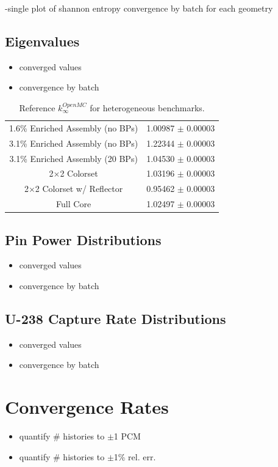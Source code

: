 -single plot of shannon entropy convergence by batch for each geometry

\subsection{Eigenvalues}

\begin{itemize}[noitemsep]
  \item converged values
  \item convergence by batch
\end{itemize}

\begin{table}[h!]
  \centering
  \caption[Reference $k^{OpenMC}_{\infty}$ for heterogeneous benchmarks]{Reference $k^{OpenMC}_{\infty}$ for heterogeneous benchmarks.}
  \small
  \label{table:chap7-ref-eigenvalues}
  \vspace{6pt}
  \begin{tabular}{c c}
  \toprule
  1.6\% Enriched Assembly (no BPs) & 1.00987 $\pm$ 0.00003 \\
  3.1\% Enriched Assembly (no BPs) & 1.22344 $\pm$ 0.00003 \\
  3.1\% Enriched Assembly (20 BPs) & 1.04530 $\pm$ 0.00003 \\
  2$\times$2 Colorset & 1.03196 $\pm$ 0.00003 \\
  2$\times$2 Colorset w/ Reflector & 0.95462 $\pm$ 0.00003 \\
  Full Core & 1.02497 $\pm$ 0.00003 \\
  \bottomrule
\end{tabular}
\end{table}

\subsection{Pin Power Distributions}

\begin{itemize}[noitemsep]
  \item converged values
  \item convergence by batch
\end{itemize}

\subsection{U-238 Capture Rate Distributions}

\begin{itemize}[noitemsep]
  \item converged values
  \item convergence by batch
\end{itemize}


\section{Convergence Rates}

\begin{itemize}[noitemsep]
  \item quantify \# histories to $\pm$1 \ac{PCM}
  \item quantify \# histories to $\pm$1\% rel. err.
\end{itemize}